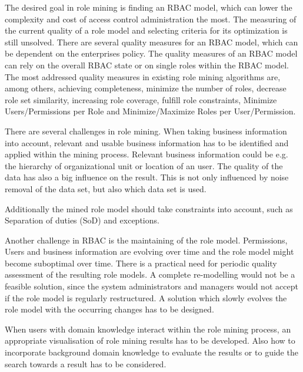 The desired goal in role mining is finding an RBAC model, which can lower the complexity and cost of access control administration the most. The measuring of the current quality of a role model and selecting criteria for its optimization is still unsolved. There are several quality measures for an RBAC model, which can be dependent on the enterprises policy. The quality measures of an RBAC model can rely on the overall RBAC state or on single roles within the RBAC model. The most addressed quality measures in existing role mining algorithms are, among others, achieving completeness, minimize the number of roles, decrease role set similarity, increasing role coverage, fulfill role constraints, Minimize Users/Permissions per Role and Minimize/Maximize Roles per User/Permission\cite{Kunz}.

There are several challenges in role mining. When taking business information into account, relevant and usable business information has to be identified and applied within the mining process. Relevant business information could be e.g. the hierarchy of organizational unit or location of an user. The quality of the data has also a big influence on the result. This is not only influenced by noise removal of the data set, but also which data set is used.

Additionally the mined role model should take constraints into account, such as Separation of duties (SoD) and exceptions. \cite{Lu}

Another challenge in RBAC is the maintaining of the role model. Permissions, Users and business information are evolving over time and the role model might become suboptimal over time. There is a practical need for periodic quality assessment of the resulting role models\cite{Kunz}. A complete re-modelling would not be a feasible solution, since the system administrators and managers would not accept if the role model is regularly restructured. A solution which slowly evolves the role model with the occurring changes has to be designed.

When users with domain knowledge interact within the role mining process, an appropriate visualisation of role mining results has to be developed. Also how to incorporate background domain knowledge to evaluate the results or to guide the search towards a result has to be considered. \cite{Han}


